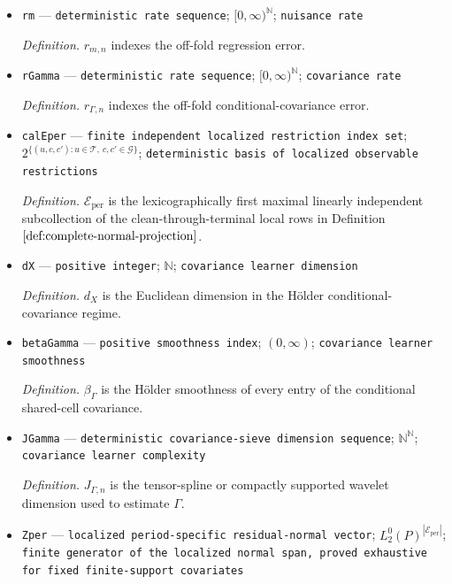 \documentclass{article}
\begin{document}
\begin{itemize}
  \par\smallskip\noindent\emph{Definition.} \(r_{p,n}\) indexes the off-fold propensity error.
  \item \texttt{rm} --- \texttt{deterministic rate sequence}; \([0,\infty)^{\mathbb N}\); \texttt{nuisance rate}
  \par\smallskip\noindent\emph{Definition.} \(r_{m,n}\) indexes the off-fold regression error.
  \item \texttt{rGamma} --- \texttt{deterministic rate sequence}; \([0,\infty)^{\mathbb N}\); \texttt{covariance rate}
  \par\smallskip\noindent\emph{Definition.} \(r_{\Gamma,n}\) indexes the off-fold conditional-covariance error.
  \item \texttt{calEper} --- \texttt{finite independent localized restriction index set}; \(2^{\{(u,c,c'):u\in\mathcal T,\ c,c'\in\mathcal G\}}\); \texttt{deterministic basis of localized observable restrictions}
  \par\smallskip\noindent\emph{Definition.} \(\mathcal E_{\mathrm{per}}\) is the lexicographically first maximal linearly independent subcollection of the clean-through-terminal local rows in Definition \(\ref{def:complete-normal-projection}\).
  \item \texttt{dX} --- \texttt{positive integer}; \(\mathbb N\); \texttt{covariance learner dimension}
  \par\smallskip\noindent\emph{Definition.} \(d_X\) is the Euclidean dimension in the Hölder conditional-covariance regime.
  \item \texttt{betaGamma} --- \texttt{positive smoothness index}; \((0,\infty)\); \texttt{covariance learner smoothness}
  \par\smallskip\noindent\emph{Definition.} \(\beta_{\Gamma}\) is the Hölder smoothness of every entry of the conditional shared-cell covariance.
  \item \texttt{JGamma} --- \texttt{deterministic covariance-\allowbreak{}sieve dimension sequence}; \(\mathbb N^{\mathbb N}\); \texttt{covariance learner complexity}
  \par\smallskip\noindent\emph{Definition.} \(J_{\Gamma,n}\) is the tensor-spline or compactly supported wavelet dimension used to estimate \(\Gamma\).
  \item \texttt{Zper} --- \texttt{localized period-\allowbreak{}specific residual-\allowbreak{}normal vector}; \(L_2^0(P)^{|\mathcal E_{\mathrm{per}}|}\); \texttt{finite generator of the localized normal span,\allowbreak{} proved exhaustive for fixed finite-\allowbreak{}support covariates}

\end{itemize}
\end{document}
